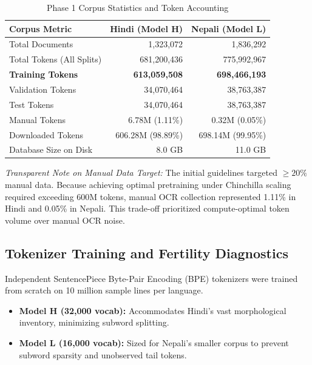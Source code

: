 \documentclass[10pt,a4paper]{article}
\begin{document}
\begin{table}[t]
\centering
\footnotesize
\setlength{\tabcolsep}{2.5pt}
\caption{Phase 1 Corpus Statistics and Token Accounting}
\label{tab:phase1_stats}
\begin{tabularx}{\columnwidth}{@{}>{\raggedright\arraybackslash}Xrr@{}}
\toprule
\textbf{Corpus Metric} & \textbf{Hindi (Model H)} & \textbf{Nepali (Model L)} \\
\midrule
Total Documents & 1,323,072 & 1,836,292 \\
Total Tokens (All Splits) & 681,200,436 & 775,992,967 \\
\textbf{Training Tokens} & \textbf{613,059,508} & \textbf{698,466,193} \\
Validation Tokens & 34,070,464 & 38,763,387 \\
Test Tokens & 34,070,464 & 38,763,387 \\
Manual Tokens & 6.78M (1.11\%) & 0.32M (0.05\%) \\
Downloaded Tokens & 606.28M (98.89\%) & 698.14M (99.95\%) \\
Database Size on Disk & 8.0 GB & 11.0 GB \\
\bottomrule
\end{tabularx}
\end{table}

\noindent\textit{Transparent Note on Manual Data Target:} The initial guidelines targeted $\ge 20\%$ manual data. Because achieving optimal pretraining under Chinchilla scaling required exceeding 600M tokens, manual OCR collection represented 1.11\% in Hindi and 0.05\% in Nepali. This trade-off prioritized compute-optimal token volume over manual OCR noise.

\subsection{Tokenizer Training and Fertility Diagnostics}
Independent SentencePiece Byte-Pair Encoding (BPE) tokenizers were trained from scratch on 10 million sample lines per language.
\begin{itemize}[noitemsep,leftmargin=*]
    \item \textbf{Model H (32,000 vocab):} Accommodates Hindi's vast morphological inventory, minimizing subword splitting.
    \item \textbf{Model L (16,000 vocab):} Sized for Nepali's smaller corpus to prevent subword sparsity and unobserved tail tokens.
\end{itemize}
\end{document}
